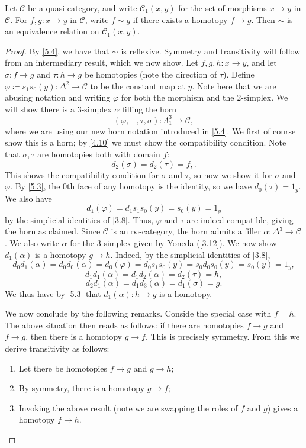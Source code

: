 \begin{proposition}\label{5.5}
	Let $\mathcal{C} $ be a quasi-category, and write $\mathcal{C} _1(x,y)$ for the set of morphisms $x\to y$ in $\mathcal{C} $. For $f,g : x \to y$ in $\mathcal{C} $, write $f\sim g$ if there exists a homotopy $f\to g$. Then $\sim $ is an equivalence relation on $\mathcal{C} _1(x,y)$.
\end{proposition}
\begin{proof}
	By \cref{5.4}, we have that $\sim $ is reflexive. Symmetry and transitivity will follow from an intermediary result, which we now show. Let $f,g,h : x \to y$, and let $\sigma : f \to g$ and $\tau : h \to g$ be homotopies (note the direction of $\tau $). Define $\varphi \coloneqq s_1s_0(y) : \Delta ^2 \to \mathcal{C} $ to be the constant map at $y$. Note here that we are abusing notation and writing $\varphi $ for both the morphism and the 2-simplex. We will show there is a 3-simplex $\alpha $ filling the horn
	\[
		(\varphi ,-,\tau ,\sigma ): \Lambda _1^3 \to \mathcal{C} 
	,\]
	where we are using our new horn notation introduced in \cref{5.4}. We first of course show this is a horn; by \cref{4.10} we must show the compatibility condition. Note that $\sigma ,\tau $ are homotopies both with domain $f$:
	\[
		d_2(\sigma )=d_2(\tau )=f,
	.\]
	This shows the compatibility condition for $\sigma $ and $\tau $, so now we show it for $\sigma $ and $\varphi $. By \cref{5.3}, the 0th face of any homotopy is the identity, so we have $d_0(\tau )=1_y$. We also have
	\[
		d_1(\varphi )=d_1s_1s_0(y)=s_0(y)=1_y
	\]
	by the simplicial identities of \cref{3.8}. Thus, $\varphi $ and $\tau $ are indeed compatible, giving the horn as claimed. Since $\mathcal{C} $ is an $\infty $-category, the horn admits a filler $\alpha : \Delta ^3 \to \mathcal{C} $. We also write $\alpha $ for the 3-simplex given by Yoneda (\cref{3.12}). We now show $d_1(\alpha )$ is a homotopy $g\to h$. Indeed, by the simplicial identities of \cref{3.8},
	\[
		d_0d_1(\alpha )=d_0d_0(\alpha )=d_0(\varphi )=d_0s_1s_0(y)=s_0d_0s_0(y)=s_0(y)=1_y,
	\]
	\[
		d_1d_1(\alpha )=d_1d_2(\alpha )=d_2(\tau )=h,
	\]
	\[
		d_2d_1(\alpha )=d_1d_3(\alpha )=d_1(\sigma )=g
	.\]
	We thus have by \cref{5.3} that $d_1(\alpha ): h \to g$ is a homotopy.

	We now conclude by the following remarks. Conside the special case with $f=h$. The above situation then reads as follows: if there are homotopies $f\to g$ and $f\to g$, then there is a homotopy $g\to f$. This is precisely symmetry. From this we derive transitivity as follows:
	\begin{enumerate}
		\item Let there be homotopies $f\to g$ and $g\to h$;
		\item By symmetry, there is a homotopy $g\to f$;
		\item Invoking the above result (note we are swapping the roles of $f$ and $g$) gives a homotopy $f\to h$.
	\end{enumerate}
\end{proof}

